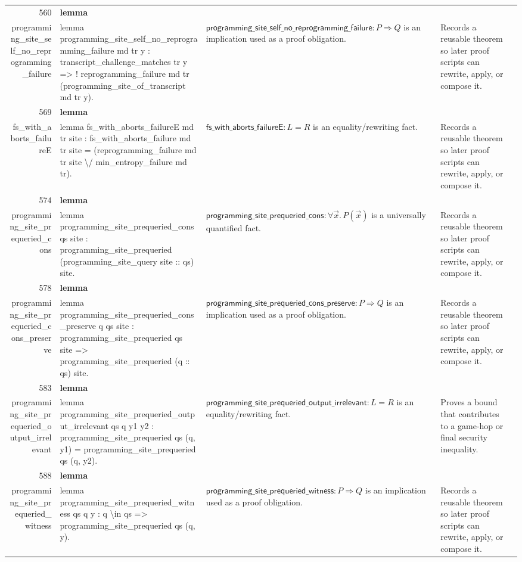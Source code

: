 \documentclass[10pt]{article}
\newcommand{\ec}[1]{\begingroup\ttfamily\scriptsize #1\endgroup}
\begin{document}
\begin{longtable}{r L{0.17\textwidth} L{0.26\textwidth} L{0.27\textwidth} L{0.20\textwidth}}
560 & \textbf{lemma}\\\ec{programming\_site\_self\_no\_reprogramming\_failure} & \ec{lemma programming\_site\_self\_no\_reprogramming\_failure md tr y : transcript\_challenge\_matches tr y => ! reprogramming\_failure md tr (programming\_site\_of\_transcript md tr y).} & \(\mathsf{programming\_site\_self\_no\_reprogramming\_failure} : P \Rightarrow Q\) is an implication used as a proof obligation. & Records a reusable theorem so later proof scripts can rewrite, apply, or compose it. \\
569 & \textbf{lemma}\\\ec{fs\_with\_aborts\_failureE} & \ec{lemma fs\_with\_aborts\_failureE md tr site : fs\_with\_aborts\_failure md tr site = (reprogramming\_failure md tr site \textbackslash{}/ min\_entropy\_failure md tr).} & \(\mathsf{fs\_with\_aborts\_failureE} : L = R\) is an equality/rewriting fact. & Records a reusable theorem so later proof scripts can rewrite, apply, or compose it. \\
574 & \textbf{lemma}\\\ec{programming\_site\_prequeried\_cons} & \ec{lemma programming\_site\_prequeried\_cons qs site : programming\_site\_prequeried (programming\_site\_query site :: qs) site.} & \(\mathsf{programming\_site\_prequeried\_cons} : \forall \vec{x}.\, P(\vec{x})\) is a universally quantified fact. & Records a reusable theorem so later proof scripts can rewrite, apply, or compose it. \\
578 & \textbf{lemma}\\\ec{programming\_site\_prequeried\_cons\_preserve} & \ec{lemma programming\_site\_prequeried\_cons\_preserve q qs site : programming\_site\_prequeried qs site => programming\_site\_prequeried (q :: qs) site.} & \(\mathsf{programming\_site\_prequeried\_cons\_preserve} : P \Rightarrow Q\) is an implication used as a proof obligation. & Records a reusable theorem so later proof scripts can rewrite, apply, or compose it. \\
583 & \textbf{lemma}\\\ec{programming\_site\_prequeried\_output\_irrelevant} & \ec{lemma programming\_site\_prequeried\_output\_irrelevant qs q y1 y2 : programming\_site\_prequeried qs (q, y1) = programming\_site\_prequeried qs (q, y2).} & \(\mathsf{programming\_site\_prequeried\_output\_irrelevant} : L = R\) is an equality/rewriting fact. & Proves a bound that contributes to a game-hop or final security inequality. \\
588 & \textbf{lemma}\\\ec{programming\_site\_prequeried\_witness} & \ec{lemma programming\_site\_prequeried\_witness qs q y : q \textbackslash{}in qs => programming\_site\_prequeried qs (q, y).} & \(\mathsf{programming\_site\_prequeried\_witness} : P \Rightarrow Q\) is an implication used as a proof obligation. & Records a reusable theorem so later proof scripts can rewrite, apply, or compose it. \\

\end{longtable}
\end{document}
